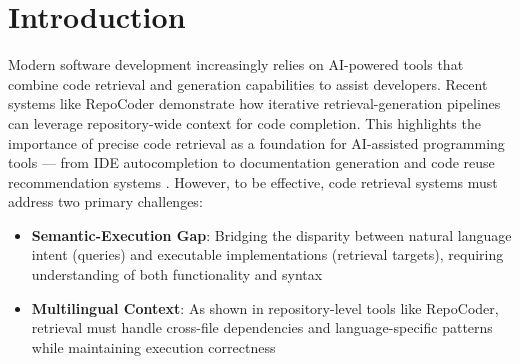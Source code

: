 \documentclass[12pt]{article}
\begin{document}
\section{Introduction}




Modern software development increasingly relies on AI-powered tools that combine code retrieval and generation capabilities to assist developers.
Recent systems like RepoCoder \cite{Zhang2023} demonstrate how iterative retrieval-generation pipelines can leverage repository-wide context for code completion.
This highlights the importance of precise code retrieval as a foundation for AI-assisted programming tools — from IDE autocompletion to documentation generation and code reuse recommendation systems \cite{Ziegler2022}.
However, to be effective, code retrieval systems must address two primary challenges:

\begin{itemize}
  \item \textbf{Semantic-Execution Gap}: Bridging the disparity between natural language intent (queries) and executable implementations (retrieval targets), requiring understanding of both functionality and syntax \cite{Wan2019}
  \item \textbf{Multilingual Context}: As shown in repository-level tools like RepoCoder, retrieval must handle cross-file dependencies and language-specific patterns while maintaining execution correctness
\end{itemize}
\end{document}

